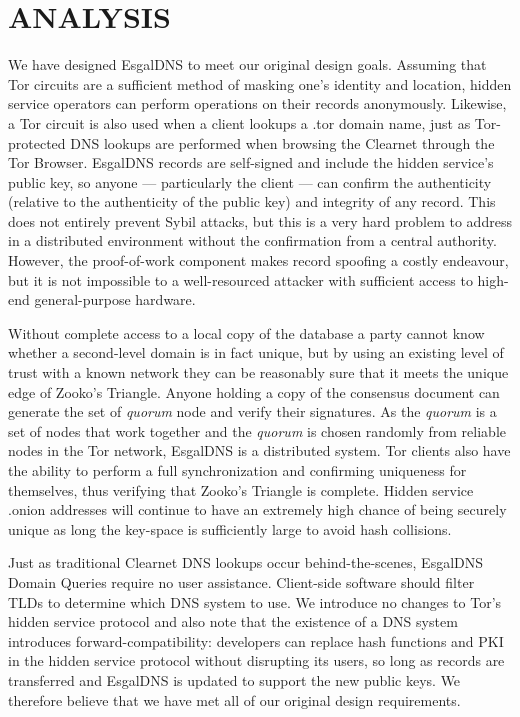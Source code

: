 
\chapter{ANALYSIS}


We have designed EsgalDNS to meet our original design goals. Assuming that Tor circuits are a sufficient method of masking one's identity and location, hidden service operators can perform operations on their records anonymously. Likewise, a Tor circuit is also used when a client lookups a .tor domain name, just as Tor-protected DNS lookups are performed when browsing the Clearnet through the Tor Browser. EsgalDNS records are self-signed and include the hidden service's public key, so anyone --- particularly the client --- can confirm the authenticity (relative to the authenticity of the public key) and integrity of any record. This does not entirely prevent Sybil attacks, but this is a very hard problem to address in a distributed environment without the confirmation from a central authority. However, the proof-of-work component makes record spoofing a costly endeavour, but it is not impossible to a well-resourced attacker with sufficient access to high-end general-purpose hardware.

Without complete access to a local copy of the database a party cannot know whether a second-level domain is in fact unique, but by using an existing level of trust with a known network they can be reasonably sure that it meets the unique edge of Zooko's Triangle. Anyone holding a copy of the consensus document can generate the set of \emph{quorum} node and verify their signatures. As the \emph{quorum} is a set of nodes that work together and the \emph{quorum} is chosen randomly from reliable nodes in the Tor network, EsgalDNS is a distributed system. Tor clients also have the ability to perform a full synchronization and confirming uniqueness for themselves, thus verifying that Zooko's Triangle is complete. Hidden service .onion addresses will continue to have an extremely high chance of being securely unique as long the key-space is sufficiently large to avoid hash collisions.

Just as traditional Clearnet DNS lookups occur behind-the-scenes, EsgalDNS Domain Queries require no user assistance. Client-side software should filter TLDs to determine which DNS system to use. We introduce no changes to Tor's hidden service protocol and also note that the existence of a DNS system introduces forward-compatibility: developers can replace hash functions and PKI in the hidden service protocol without disrupting its users, so long as records are transferred and EsgalDNS is updated to support the new public keys. We therefore believe that we have met all of our original design requirements.

